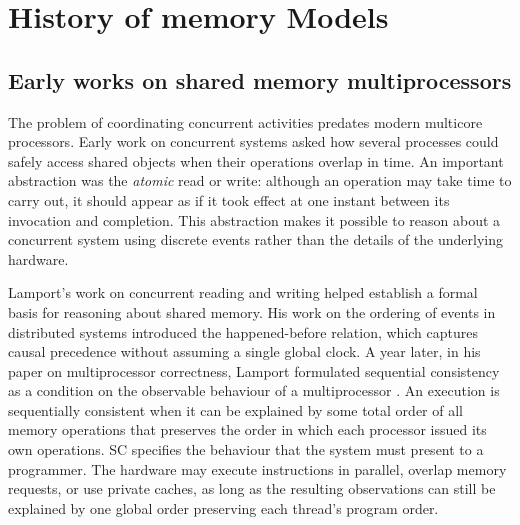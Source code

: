 \section{History of memory Models}

\subsection{Early works on shared memory multiprocessors}

The problem of coordinating concurrent activities predates modern multicore processors. Early work on concurrent systems asked how several processes could safely access shared objects when their operations overlap in time. An important abstraction was the \emph{atomic} read or write: although an operation may take time to carry out, it should appear as if it took effect at one instant between its invocation and completion. This abstraction makes it possible to reason about a concurrent system using discrete events rather than the details of the underlying hardware.

Lamport's work on concurrent reading and writing \cite{10.1145/359863.359878} helped establish a formal basis for reasoning about shared memory. His work on the ordering of events in distributed systems \cite{Lamport78} introduced the happened-before relation, which captures causal precedence without assuming a single global clock. A year later, in his paper on multiprocessor correctness, Lamport formulated sequential consistency as a condition on the observable behaviour of a multiprocessor \cite{lamport1979sc}. An execution is sequentially consistent when it can be explained by some total order of all memory operations that preserves the order in which each processor issued its own operations.
SC specifies the behaviour that the system must present to a programmer. The hardware may execute instructions in parallel, overlap memory requests, or use private caches, as long as the resulting observations can still be explained by one global order preserving each thread's program order. 




